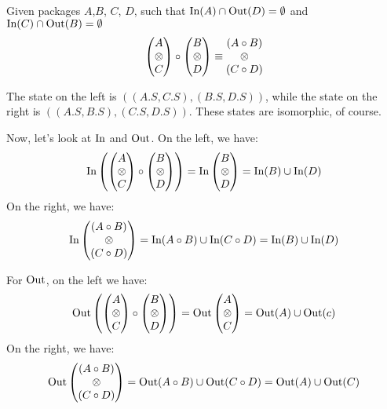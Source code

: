 \begin{lemma}
    Given packages $A$,$B$, $C$, $D$, such that
    $\text{In}(A) \cap \text{Out}(D) = \emptyset$ and $\text{In}(C) \cap \text{Out}(B) = \emptyset$
    $$
    \begin{pmatrix}
        A\cr
        \otimes\cr
        C\cr
    \end{pmatrix}
    \circ
    \begin{pmatrix}
        B\cr
        \otimes\cr
        D\cr
    \end{pmatrix}
    \equiv
    \begin{matrix}
        (A \circ B)\cr
        \otimes\cr
        (C \circ D)\cr
    \end{matrix}
    $$

     The state on the left is $((A.S, C.S), (B.S, D.S))$,
    while the state on the right is $((A.S, B.S), (C.S, D.S))$.
    These states are isomorphic, of course.

    Now, let's look at $\text{In}$ and $\text{Out}$.
    On the left, we have:
    $$
    \text{In}\left(
    \begin{pmatrix}
        A\cr
        \otimes\cr
        C\cr
    \end{pmatrix}
    \circ
    \begin{pmatrix}
        B\cr
        \otimes\cr
        D\cr
    \end{pmatrix}
    \right)
    =
    \text{In}
    \begin{pmatrix}
        B\cr
        \otimes\cr
        D\cr
    \end{pmatrix}
    = \text{In}(B) \cup \text{In}(D)
    $$
    On the right, we have:
    $$
    \text{In}
    \begin{pmatrix}
        (A \circ B)\cr
        \otimes\cr
        (C \circ D)\cr
    \end{pmatrix}
    =
    \text{In}(A \circ B) \cup \text{In}(C \circ D)
    = \text{In}(B) \cup \text{In}(D)
    $$

    For $\text{Out}$, on the left we have:
    $$
    \text{Out}\left(
    \begin{pmatrix}
        A\cr
        \otimes\cr
        C\cr
    \end{pmatrix}
    \circ
    \begin{pmatrix}
        B\cr
        \otimes\cr
        D\cr
    \end{pmatrix}
    \right)
    =
    \text{Out}
    \begin{pmatrix}
        A\cr
        \otimes\cr
        C\cr
    \end{pmatrix}
    = \text{Out}(A) \cup \text{Out}(c)
    $$
    On the right, we have:
    $$
    \text{Out}
    \begin{pmatrix}
        (A \circ B)\cr
        \otimes\cr
        (C \circ D)\cr
    \end{pmatrix}
    =
    \text{Out}(A \circ B) \cup \text{Out}(C \circ D)
    = \text{Out}(A) \cup \text{Out}(C)
    $$


\end{lemma}
